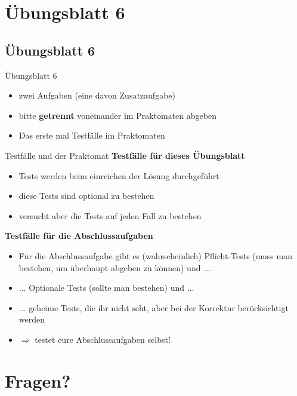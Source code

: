\documentclass[18pt]{beamer}
\begin{document}
\section{Übungsblatt 6}
\subsection*{Übungsblatt 6}

\begin{frame}{Übungsblatt 6}
	\begin{itemize}
		\item zwei Aufgaben (eine davon Zusatzaufgabe)
		\item bitte \textbf{getrennt} voneinander im Praktomaten abgeben
		\item Das erste mal Testfälle im Praktomaten
	\end{itemize}
\end{frame}


\begin{frame}{Testfälle und der Praktomat}
	\textbf{Testfälle für dieses Übungsblatt}
	\begin{itemize}
		\item Tests werden beim einreichen der Lösung durchgeführt
		\item diese Tests sind optional zu bestehen
		\item versucht aber die Tests auf jeden Fall zu bestehen
	\end{itemize}\pause
	
		\textbf{Testfälle für die Abschlussaufgaben}
	\begin{itemize}
		\item Für die Abschlussaufgabe gibt es (wahrscheinlich) Pflicht-Tests (muss man bestehen, um überhaupt abgeben zu können) und ...
		\item ... Optionale Tests (sollte man bestehen) und ...
		\item ... geheime Tests, die ihr nicht seht, aber bei der Korrektur berücksichtigt werden
		\item $\Rightarrow$ testet eure Abschlussaufgaben selbst!
	\end{itemize}
\end{frame}

\section{Fragen?}
\end{document}
